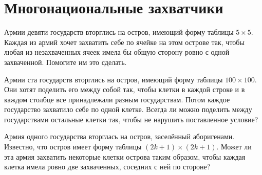 \section{Многонациональные захватчики}
\begin{itemize}

\itA Армии девяти государств вторглись на остров, имеющий форму таблицы $5 \times 5$. Каждая из армий хочет захватить себе по ячейке на этом острове так, чтобы любая из незахваченных ячеек имела бы общую сторону ровно с одной захваченной. Помогите им это сделать.

\itB Армии ста государств вторглись на остров, имеющий форму таблицы $100 \times 100$. Они хотят поделить его между собой так, чтобы клетки в каждой строке и в каждом столбце все принадлежали разным государствам. Потом каждое государство захватило себе по одной клетке. Всегда ли можно поделить между государствами остальные клетки так, чтобы не нарушить поставленное условие?

\itC Армия одного государства вторглась на остров, заселённый аборигенами. Известно, что остров имеет форму таблицы $(2k+1) \times (2k+1)$. Может ли эта армия захватить некоторые клетки острова таким образом, чтобы каждая клетка имела ровно две захваченных, соседних с ней по стороне?
\end{itemize}